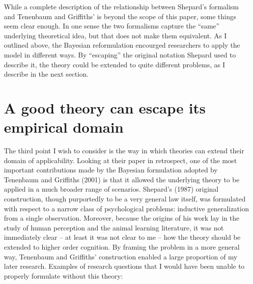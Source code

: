 \documentclass[english,doc]{apa6}
\begin{document}
While a complete description of the relationship between Shepard's formalism and Tenenbaum and Griffiths' is beyond the scope of this paper, some things seem clear enough. In one sense the two formalisms capture the \enquote{same} underlying theoretical idea, but that does not make them equivalent. As I outlined above, the Bayesian reformulation encourged researchers to apply the model in different ways. By \enquote{escaping} the original notation Shepard used to describe it, the theory could be extended to quite different problems, as I describe in the next section.

\hypertarget{a-good-theory-can-escape-its-empirical-domain}{%
\section{A good theory can escape its empirical domain}\label{a-good-theory-can-escape-its-empirical-domain}}

\noindent
The third point I wish to consider is the way in which theories can extend their domain of applicability. Looking at their paper in retrospect, one of the most important contributions made by the Bayesian formulation adopted by Tenenbaum and Griffiths (2001) is that it allowed the underlying theory to be applied in a much broader range of scenarios. Shepard's (1987) original construction, though purportedly to be a very general law itself, was formulated with respect to a narrow class of psychological problems: inductive generalization from a single observation. Moreover, because the origins of his work lay in the study of human perception and the animal learning literature, it was not immediately clear -- at least it was not clear to me -- how the theory should be extended to higher order cognition. By framing the problem in a more general way, Tenenbaum and Griffiths' construction enabled a large proportion of my later research. Examples of research questions that I would have been unable to properly formulate without this theory:
\end{document}
